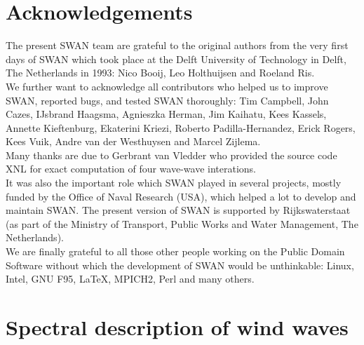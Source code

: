 \documentclass[12pt]{book}
\begin{document}
\section{Acknowledgements} \label{sec:acknow}

The present SWAN team are grateful to the original authors from the very first days of SWAN which took place at
the Delft University of Technology in Delft, The Netherlands in 1993: Nico Booij, Leo Holthuijsen and Roeland Ris.
\\[2ex]
\noindent
We further want to acknowledge all contributors who helped us to improve SWAN, reported bugs, and tested SWAN
thoroughly: Tim Campbell, John Cazes, IJsbrand Haagsma, Agnieszka Herman, Jim Kaihatu, Kees Kassels, Annette Kieftenburg,
Ekaterini Kriezi, Roberto Padilla-Hernandez, Erick Rogers, Kees Vuik, Andre van der Westhuysen and Marcel Zijlema.
\\[2ex]
\noindent
Many thanks are due to Gerbrant van Vledder who provided the source code XNL for exact
computation of four wave-wave interations.
\\[2ex]
\noindent
It was also the important role which SWAN played in several projects, mostly funded by the Office of Naval
Research (USA), which helped a lot to develop and maintain SWAN. The present version of SWAN is supported by
Rijkswaterstaat (as part of the Ministry of Transport, Public Works and Water Management, The Netherlands).
\\[2ex]
\noindent
We are finally grateful to all those other people working on the Public Domain Software without which the development
of SWAN would be unthinkable: Linux, Intel, GNU F95, \LaTeX, MPICH2, Perl and many others.

 \label{ch:goveq}

\section{Spectral description of wind waves}
\end{document}
